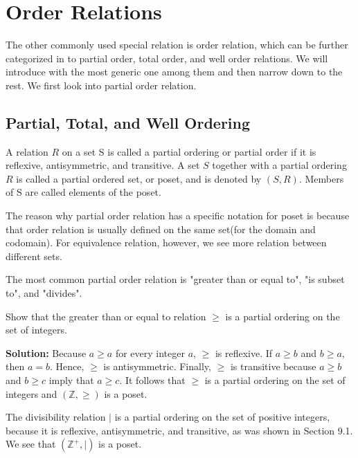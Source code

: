 \section{Order Relations}
The other commonly used special relation is order relation, which can be further categorized in to partial order, total order, and well order relations. We will
introduce with the most generic one among them and then narrow down to the rest. We first look into partial order relation.
\subsection{Partial, Total, and Well Ordering}
\begin{definition}
    A relation $R$ on a set S is called a partial ordering or partial order if it is reflexive, antisymmetric, and transitive. A set $S$ together with a partial ordering $R$ is 
    called a partial ordered set, or poset, and is denoted by $(S,R)$. Members of S are called elements of the poset.
\end{definition}
\begin{remark}
    The reason why partial order relation has a specific notation for poset is because that order relation is usually defined on the same set(for the domain and codomain). For 
    equivalence relation, however, we see more relation between different sets.
\end{remark}

The most common partial order relation is "greater than or equal to", "is subset to", and "divides".
\begin{example}
    Show that the greater than or equal to relation $\geq$ is a partial ordering on the set of integers.
\end{example}
    
    \textbf{Solution:} Because $a \geq a$ for every integer $a$, $\geq$ is reflexive. If $a \geq b$ and $b \geq a$, then $a = b$. Hence, $\geq$ is antisymmetric. 
    Finally, $\geq$ is transitive because $a \geq b$ and $b \geq c$ imply that $a \geq c$. It follows that $\geq$ is a partial ordering on the set of integers and 
    $(\mathbb{Z}, \geq)$ is a poset.

\begin{example}
    The divisibility relation $|$ is a partial ordering on the set of positive integers, because it is reflexive, antisymmetric, and transitive, as was shown in Section 9.1. We see that $(\mathbb{Z}^+, |)$ is a poset.
\end{example}
        
